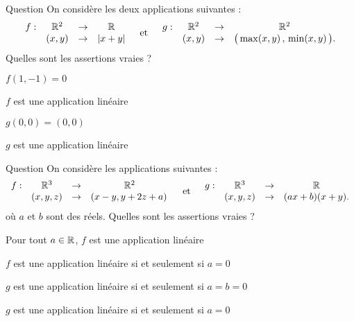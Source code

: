 \begin{multi}[multiple,feedback=
{\(f\) n'est pas linéaire. Contre-exemple : \(f((1,0)+(-1,0))=f(0,0)=0\) et \(f(1,0)+f(-1,0)=|1|+|-1|=2\).
\vskip0mm
\(g\) n'est pas linéaire. Contre-exemple :  \(g((1,0)+(-1,0))=g(0,0)=(0,0)\) 
et \(g(1,0)+g(-1,0)=(1,0)+(0,-1)=(1,-1)\).
}]{Question}
On considère les deux applications suivantes : 
\[\begin{array}{rccc}f:&\mathbb{R}^2&\to&\mathbb{R}\\
& (x,y)&\to & |x+y| \end{array} \quad \mbox{et} \quad \begin{array}{rccc}g:&\mathbb{R}^2&\to&\mathbb{R}^2\\
& (x,y)&\to &\big(\max (x,y)\, , \, \min (x,y)\, \big). \end{array}\] 
Quelles sont les assertions vraies ?

    \item* \(f(1,-1)=0\)
    \item \(f\) est une application linéaire
    \item* \(g(0,0)=(0,0)\)
    \item \(g\) est une application linéaire
\end{multi}


\begin{multi}[multiple,feedback=
{Si \(a\neq 0\), alors \(f(0,0,0)=(0,a)\neq(0,0)\), donc \(f\) n'est pas linéaire. On vérifie aussi que, si \(a=0\), alors \(f\) est linéaire.
\vskip0mm
Si \(a\neq 0\), \(g(2(1,0,0))=4a+2b\) et \(2g(1,0,0)=2a+2b \neq 4a+2b\), donc \(g\) n'est pas linéaire.
\vskip0mm
On vérifie que si \(a=0\) et \(b\) est quelconque, \(g\) est linéaire.
}]{Question}
On considère les applications suivantes : 
\[\begin{array}{rccc}f:&\mathbb{R}^3&\to&\mathbb{R}^2\\
& (x,y,z)&\to &(x-y,y+2z+a) \,  \end{array}  \quad \mbox{et} \quad  \begin{array}{rccc}g:&\mathbb{R}^3&\to&\mathbb{R}\\
& (x,y,z)&\to &(ax+b)(x+y).\end{array} \] 
où \(a\) et \(b\)  sont des réels. Quelles sont les assertions vraies ?

    \item Pour tout \(a\in \mathbb{R}\), \(f\) est une application linéaire
    \item* \(f\) est une application linéaire si et seulement si \(a=0\)
    \item \(g\) est une application linéaire si et seulement si \(a=b=0\)
    \item* \(g\) est une application linéaire si et seulement si \(a=0\)
\end{multi}


